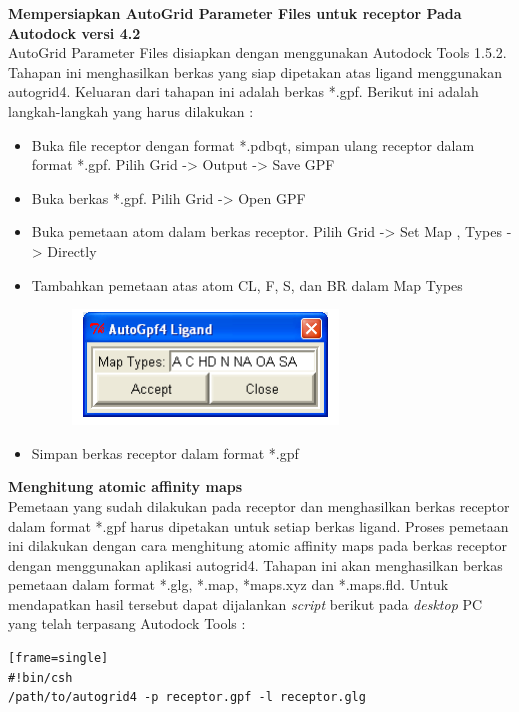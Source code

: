 \textbf{Mempersiapkan AutoGrid Parameter Files untuk receptor Pada Autodock versi 4.2} \\
AutoGrid Parameter Files disiapkan dengan menggunakan Autodock Tools 1.5.2. Tahapan ini menghasilkan berkas yang siap dipetakan atas ligand menggunakan autogrid4. Keluaran dari tahapan ini adalah berkas *.gpf. Berikut ini adalah langkah-langkah yang harus dilakukan :
\begin{itemize}
	\item Buka file receptor dengan format *.pdbqt, simpan ulang receptor dalam format *.gpf. Pilih Grid -> Output -> Save GPF
	\item Buka berkas *.gpf. Pilih Grid -> Open GPF
	\item Buka pemetaan atom dalam berkas receptor. Pilih Grid -> Set Map , Types -> Directly
	\item Tambahkan pemetaan atas atom CL, F, S, dan BR dalam Map Types
	\begin{figure}
		\centering
		\includegraphics{autogrid4.PNG}
	\end{figure}
	\item Simpan berkas receptor dalam format *.gpf
\end{itemize}

\noindent \textbf{Menghitung atomic affinity maps} \\
Pemetaan yang sudah dilakukan pada receptor dan menghasilkan berkas receptor dalam format *.gpf harus dipetakan untuk setiap berkas ligand. Proses pemetaan ini dilakukan dengan cara menghitung atomic affinity maps pada berkas receptor dengan menggunakan aplikasi autogrid4. Tahapan ini akan menghasilkan berkas pemetaan dalam format *.glg, *.map, *maps.xyz dan *.maps.fld. Untuk mendapatkan hasil tersebut dapat dijalankan \textit{script} berikut pada \textit{desktop} PC yang telah terpasang Autodock Tools : \\
\begin{lstlisting}[caption=\textit{Script} untuk menghitung atomic affinity maps][frame=single]
#!bin/csh
/path/to/autogrid4 -p receptor.gpf -l receptor.glg
\end{lstlisting}



